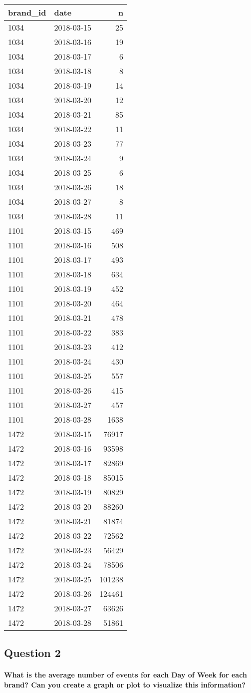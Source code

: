 \documentclass[]{article}
\let\oldparagraph\paragraph
\renewcommand{\paragraph}[1]{\oldparagraph{#1}\mbox{}}
\begin{document}
\begin{longtable}[]{@{}llr@{}}
\toprule
brand\_id & date & n\tabularnewline
\midrule
\endhead
1034 & 2018-03-15 & 25\tabularnewline
1034 & 2018-03-16 & 19\tabularnewline
1034 & 2018-03-17 & 6\tabularnewline
1034 & 2018-03-18 & 8\tabularnewline
1034 & 2018-03-19 & 14\tabularnewline
1034 & 2018-03-20 & 12\tabularnewline
1034 & 2018-03-21 & 85\tabularnewline
1034 & 2018-03-22 & 11\tabularnewline
1034 & 2018-03-23 & 77\tabularnewline
1034 & 2018-03-24 & 9\tabularnewline
1034 & 2018-03-25 & 6\tabularnewline
1034 & 2018-03-26 & 18\tabularnewline
1034 & 2018-03-27 & 8\tabularnewline
1034 & 2018-03-28 & 11\tabularnewline
1101 & 2018-03-15 & 469\tabularnewline
1101 & 2018-03-16 & 508\tabularnewline
1101 & 2018-03-17 & 493\tabularnewline
1101 & 2018-03-18 & 634\tabularnewline
1101 & 2018-03-19 & 452\tabularnewline
1101 & 2018-03-20 & 464\tabularnewline
1101 & 2018-03-21 & 478\tabularnewline
1101 & 2018-03-22 & 383\tabularnewline
1101 & 2018-03-23 & 412\tabularnewline
1101 & 2018-03-24 & 430\tabularnewline
1101 & 2018-03-25 & 557\tabularnewline
1101 & 2018-03-26 & 415\tabularnewline
1101 & 2018-03-27 & 457\tabularnewline
1101 & 2018-03-28 & 1638\tabularnewline
1472 & 2018-03-15 & 76917\tabularnewline
1472 & 2018-03-16 & 93598\tabularnewline
1472 & 2018-03-17 & 82869\tabularnewline
1472 & 2018-03-18 & 85015\tabularnewline
1472 & 2018-03-19 & 80829\tabularnewline
1472 & 2018-03-20 & 88260\tabularnewline
1472 & 2018-03-21 & 81874\tabularnewline
1472 & 2018-03-22 & 72562\tabularnewline
1472 & 2018-03-23 & 56429\tabularnewline
1472 & 2018-03-24 & 78506\tabularnewline
1472 & 2018-03-25 & 101238\tabularnewline
1472 & 2018-03-26 & 124461\tabularnewline
1472 & 2018-03-27 & 63626\tabularnewline
1472 & 2018-03-28 & 51861\tabularnewline
\bottomrule
\end{longtable}

\subsection{Question 2}\label{question-2}

\paragraph{What is the average number of events for each Day of Week for
each brand? Can you create a graph or plot to visualize this
information?}\label{what-is-the-average-number-of-events-for-each-day-of-week-for-each-brand-can-you-create-a-graph-or-plot-to-visualize-this-information}
\end{document}

